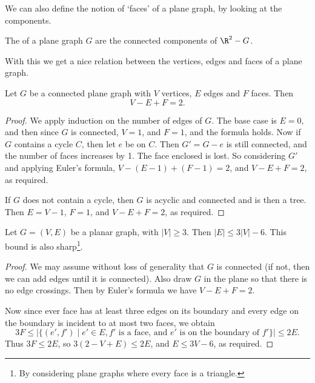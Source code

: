\documentclass[a4paper]{scrartcl}
\begin{document}
We can also define the notion of `faces' of a plane graph, by looking at the components.

\begin{definition}[Faces]
	The  of a plane graph $G$ are the connected components of $\R^2 - G$.
\end{definition}

With this we get a nice relation between the vertices, edges and faces of a plane graph.

\begin{theorem}
	Let $G$ be a connected plane graph with $V$ vertices, $E$ edges and $F$ faces. Then
	$$
	V - E + F = 2.
	$$
\end{theorem}
\begin{proof}
	We apply induction on the number of edges of $G$. The base case is $E = 0$, and then since $G$ is connected, $V = 1$, and $F = 1$, and the formula holds. 
	Now if $G$ contains a cycle $C$, then let $e$ be on $C$. Then $G' = G - e$ is still connected, and the number of faces increases by 1. The face enclosed is lost. So considering $G'$ and applying Euler's formula, $V - (E - 1) + (F - 1) = 2$, and $V - E + F = 2$, 
	as required.

	If $G$ does not contain a cycle, then $G$ is acyclic and connected and is then a tree. Then $E = V - 1$, $F = 1$, and $V - E + F = 2$, as required.
\end{proof}

\begin{corollary}
	Let $G = (V, E)$ be a planar graph, with $|V| \geq 3$. Then $|E| \leq 3|V| - 6$. This bound is also sharp\footnote{By considering plane graphs where every face is a triangle.}.
\end{corollary}
\begin{proof}
	We may assume without loss of generality that $G$ is connected (if not, then we can add edges until it is connected). Also draw $G$ in the plane so that there is no edge crossings. Then by Euler's formula we have $V - E + F = 2$.

	Now since ever face has at least three edges on its boundary and every edge on the boundary is incident to at most two faces, we obtain
	$$
	3F \leq \left|\{(e', f') \mid e' \in E, f' \text{ is a face, and } e' \text{ is on the boundary of }f'\}\right| \leq 2E.
	$$
	Thus $3F \leq 2E$, so $3(2 - V + E) \leq 2E$, and $E \leq 3V - 6$, as required.
\end{proof}
\end{document}
